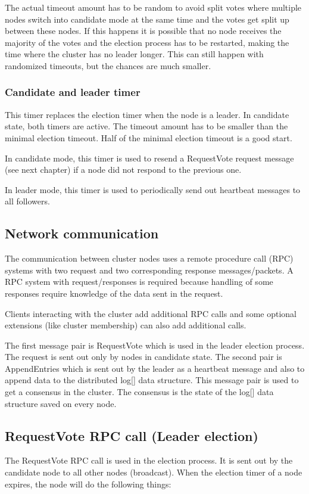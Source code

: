 The actual timeout amount has to be random to avoid split votes where multiple nodes switch into candidate mode at the same time and the votes get split
up between these nodes. If this happens it is possible that no node receives the majority of the votes and the election process has to be restarted,
making the time where the cluster has no leader longer. This can still happen with randomized timeouts, but the chances are much smaller.

\subsubsection*{Candidate and leader timer}
This timer replaces the election timer when the node is a leader. In candidate state, both timers are active.
The timeout amount has to be smaller than the minimal election timeout. Half of the minimal election timeout is a good start.

In candidate mode, this timer is used to resend a RequestVote request message (see next chapter) if a node did not respond to the previous one.

In leader mode, this timer is used to periodically send out heartbeat messages to all followers.

\subsection{Network communication}

The communication between cluster nodes uses a remote procedure call (RPC) systems with two request and two corresponding response messages/packets. A RPC system with request/responses is required because handling of some responses require knowledge of the data sent in the request.

Clients interacting with the cluster add additional RPC calls and some optional extensions (like cluster membership) can also add additional calls.

The first message pair is RequestVote which is used in the leader election process. The request is sent out only by nodes in candidate state.
The second pair is AppendEntries which is sent out by the leader as a heartbeat message and also to append data to the distributed log[] data structure.
This message pair is used to get a consensus in the cluster. The consensus is the state of the log[] data structure saved on every node.

\subsection{RequestVote RPC call (Leader election)}
The RequestVote RPC call is used in the election process. It is sent out by the candidate node to all other nodes (broadcast). When the election timer of a node expires, the node will do the following things:

